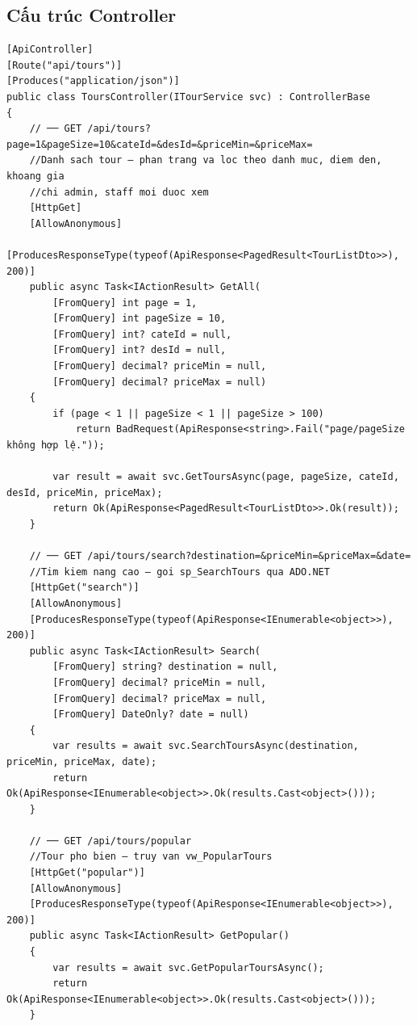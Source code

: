 \subsection{Cấu trúc Controller}\label{sub4.1.2}


\begin{lstlisting}[style=csharp, caption={ToursController --- các action chính}]
[ApiController]
[Route("api/tours")]
[Produces("application/json")]
public class ToursController(ITourService svc) : ControllerBase
{
    // ── GET /api/tours?page=1&pageSize=10&cateId=&desId=&priceMin=&priceMax=
    //Danh sach tour — phan trang va loc theo danh muc, diem den, khoang gia
    //chi admin, staff moi duoc xem
    [HttpGet]
    [AllowAnonymous]
    [ProducesResponseType(typeof(ApiResponse<PagedResult<TourListDto>>), 200)]
    public async Task<IActionResult> GetAll(
        [FromQuery] int page = 1,
        [FromQuery] int pageSize = 10,
        [FromQuery] int? cateId = null,
        [FromQuery] int? desId = null,
        [FromQuery] decimal? priceMin = null,
        [FromQuery] decimal? priceMax = null)
    {
        if (page < 1 || pageSize < 1 || pageSize > 100)
            return BadRequest(ApiResponse<string>.Fail("page/pageSize không hợp lệ."));

        var result = await svc.GetToursAsync(page, pageSize, cateId, desId, priceMin, priceMax);
        return Ok(ApiResponse<PagedResult<TourListDto>>.Ok(result));
    }

    // ── GET /api/tours/search?destination=&priceMin=&priceMax=&date=
    //Tim kiem nang cao — goi sp_SearchTours qua ADO.NET
    [HttpGet("search")]
    [AllowAnonymous]
    [ProducesResponseType(typeof(ApiResponse<IEnumerable<object>>), 200)]
    public async Task<IActionResult> Search(
        [FromQuery] string? destination = null,
        [FromQuery] decimal? priceMin = null,
        [FromQuery] decimal? priceMax = null,
        [FromQuery] DateOnly? date = null)
    {
        var results = await svc.SearchToursAsync(destination, priceMin, priceMax, date);
        return Ok(ApiResponse<IEnumerable<object>>.Ok(results.Cast<object>()));
    }

    // ── GET /api/tours/popular
    //Tour pho bien — truy van vw_PopularTours
    [HttpGet("popular")]
    [AllowAnonymous]
    [ProducesResponseType(typeof(ApiResponse<IEnumerable<object>>), 200)]
    public async Task<IActionResult> GetPopular()
    {
        var results = await svc.GetPopularToursAsync();
        return Ok(ApiResponse<IEnumerable<object>>.Ok(results.Cast<object>()));
    }


\end{lstlisting}
